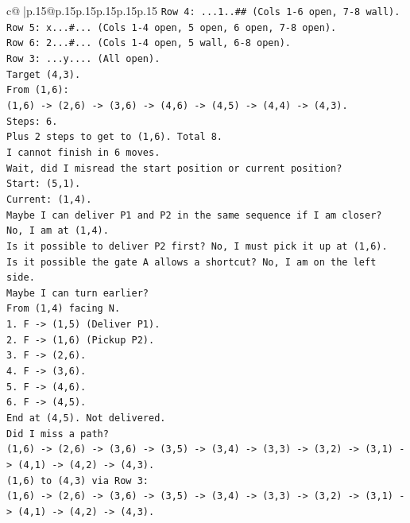 \documentclass{article}
\begin{document}
{\begin{supertabular}{c@{$\;$}|p{.15\linewidth}@{}p{.15\linewidth}p{.15\linewidth}p{.15\linewidth}p{.15\linewidth}p{.15\linewidth}}
{{{\texttt{Row 4: ...1..\#\# (Cols 1{-}6 open, 7{-}8 wall).} \\
\texttt{Row 5: x...\#... (Cols 1{-}4 open, 5 open, 6 open, 7{-}8 open).} \\
\texttt{Row 6: 2...\#... (Cols 1{-}4 open, 5 wall, 6{-}8 open).} \\
\texttt{Row 3: ...y.... (All open).} \\
\texttt{Target (4,3).} \\
\texttt{From (1,6):} \\
\texttt{(1,6) {-}> (2,6) {-}> (3,6) {-}> (4,6) {-}> (4,5) {-}> (4,4) {-}> (4,3).} \\
\texttt{Steps: 6.} \\
\texttt{Plus 2 steps to get to (1,6). Total 8.} \\
\texttt{I cannot finish in 6 moves.} \\
\texttt{Wait, did I misread the start position or current position?} \\
\texttt{Start: (5,1).} \\
\texttt{Current: (1,4).} \\
\texttt{Maybe I can deliver P1 and P2 in the same sequence if I am closer?} \\
\texttt{No, I am at (1,4).} \\
\texttt{Is it possible to deliver P2 first? No, I must pick it up at (1,6).} \\
\texttt{Is it possible the gate A allows a shortcut? No, I am on the left side.} \\
\texttt{Maybe I can turn earlier?} \\
\texttt{From (1,4) facing N.} \\
\texttt{1. F {-}> (1,5) (Deliver P1).} \\
\texttt{2. F {-}> (1,6) (Pickup P2).} \\
\texttt{3. F {-}> (2,6).} \\
\texttt{4. F {-}> (3,6).} \\
\texttt{5. F {-}> (4,6).} \\
\texttt{6. F {-}> (4,5).} \\
\texttt{End at (4,5). Not delivered.} \\
\texttt{Did I miss a path?} \\
\texttt{(1,6) {-}> (2,6) {-}> (3,6) {-}> (3,5) {-}> (3,4) {-}> (3,3) {-}> (3,2) {-}> (3,1) {-}> (4,1) {-}> (4,2) {-}> (4,3).} \\
\texttt{(1,6) to (4,3) via Row 3:} \\
\texttt{(1,6) {-}> (2,6) {-}> (3,6) {-}> (3,5) {-}> (3,4) {-}> (3,3) {-}> (3,2) {-}> (3,1) {-}> (4,1) {-}> (4,2) {-}> (4,3).} \\
}}}
\end{supertabular}}
\end{document}
